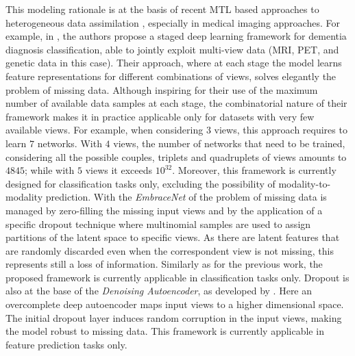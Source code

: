 This modeling rationale is at the basis of recent MTL based approaches to heterogeneous data assimilation \citep{Wu2018, Shi2019},
especially in medical imaging approaches.
%
For example, in \cite{Zhou2019a}, the authors propose a staged deep learning framework for dementia diagnosis classification,
able to jointly exploit multi-view data (MRI, PET, and genetic data in this case).
Their approach, where at each stage the model learns feature representations for different combinations of views, solves elegantly the problem of missing data.
Although inspiring for their use of the maximum number of available data samples at each stage,
the combinatorial nature of their framework makes it in practice applicable only for datasets with very few available views.
For example, when considering $3$ views, this approach requires to learn $7$ networks.
With $4$ views, the number of networks that need to be trained, considering all the possible couples, triplets and quadruplets of views amounts to $4845$;
while with $5$ views it exceeds $10^{32}$.
Moreover, this framework is currently designed for classification tasks only, excluding the possibility of modality-to-modality prediction.
With the \textit{EmbraceNet} of \cite{embracenet} the problem of missing data is managed by zero-filling the missing input views and by the application of a specific dropout technique where multinomial samples are used to assign partitions of the latent space to specific views.
As there are latent features that are randomly discarded even when the correspondent view is not missing, this represents still a loss of information.
Similarly as for the previous work, the proposed framework is currently applicable in classification tasks only.
Dropout is also at the base of the \textit{Denoising Autoencoder}, as developed by \cite{dae}.
Here an overcomplete deep autoencoder maps input views to a higher dimensional space.
The initial dropout layer induces random corruption in the input views, making the model robust to missing data.
This framework is currently applicable in feature prediction tasks only.

